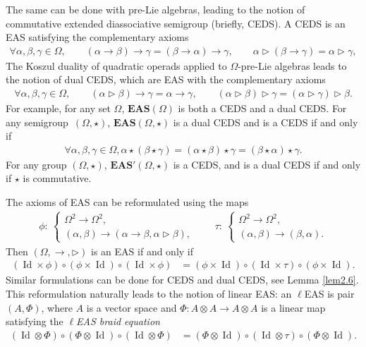 \documentclass[10pt,a4paper]{amsart}
\numberwithin{equation}{section}
\newcommand{\eas}{\mathbf{EAS}}
\begin{document}
The same can be done with pre-Lie algebras, leading to the notion of commutative extended diassociative semigroup (briefly, CEDS). A CEDS is an EAS satisfying the complementary axioms
\begin{gather*}
\forall \alpha,\beta,\gamma \in \Omega,\qquad(\alpha \rightarrow \beta) \rightarrow \gamma =(\beta \rightarrow \alpha) \rightarrow \gamma,\qquad
\alpha \triangleright (\beta \rightarrow \gamma) =\alpha \triangleright \gamma,
\end{gather*}
The Koszul duality of quadratic operads applied to $\Omega$-pre-Lie algebras leads to the notion of dual CEDS, which are EAS with the complementary axioms
\begin{gather*}
 \forall \alpha,\beta,\gamma \in \Omega,\qquad (\alpha \triangleright \beta) \rightarrow \gamma=\alpha \rightarrow \gamma,\qquad
(\alpha \triangleright \beta) \triangleright \gamma =(\alpha \triangleright \gamma)\triangleright \beta.
\end{gather*}
For example, for any set $\Omega$, $\eas(\Omega)$ is both a CEDS and a dual CEDS. For any semigroup~$(\Omega,\star)$, $\eas(\Omega,\star)$ is a dual CEDS and is a CEDS if and only if
\begin{align*}
\forall \alpha,\beta,\gamma \in \Omega,\alpha \star (\beta \star \gamma)=(\alpha \star \beta) \star \gamma=(\beta \star \alpha) \star \gamma.
\end{align*}
For any group $(\Omega,\star)$, $\eas'(\Omega,\star)$ is a CEDS, and is a dual CEDS if and only if $\star$ is commutative.

The axioms of EAS can be reformulated using the maps
\begin{gather*}
\phi\colon\ \begin{cases}
\Omega^2\longrightarrow\Omega^2,\\
(\alpha,\beta)\longrightarrow(\alpha \rightarrow \beta,\alpha \triangleright \beta),
\end{cases}\qquad
\tau\colon\ \begin{cases}
\Omega^2\longrightarrow\Omega^2,\\
(\alpha,\beta)\longrightarrow(\beta,\alpha).
\end{cases}
\end{gather*}
Then $(\Omega,\rightarrow,\triangleright)$ is an EAS if and only if
\begin{align*}
(\operatorname{Id} \times \phi)\circ (\phi\times \operatorname{Id})\circ (\operatorname{Id} \times \phi)&=(\phi \times \operatorname{Id})\circ (\operatorname{Id} \times \tau)\circ (\phi\times \operatorname{Id}).
\end{align*}
Similar formulations can be done for CEDS and dual CEDS, see Lemma \ref{lem2.6}.
This reformulation naturally leads to the notion of linear EAS: an $\ell$EAS is pair $(A,\Phi)$, where $A$ is a vector space and $\Phi\colon A\otimes A\longrightarrow A\otimes A$ is a linear map satisfying the \emph{$\ell$EAS braid equation}
\begin{align*}
(\operatorname{Id} \otimes \Phi)\circ (\Phi\otimes \operatorname{Id})\circ (\operatorname{Id} \otimes \Phi)&=(\Phi \otimes \operatorname{Id})\circ (\operatorname{Id} \otimes \tau)\circ (\Phi\otimes \operatorname{Id}).
\end{align*}
\end{document}
